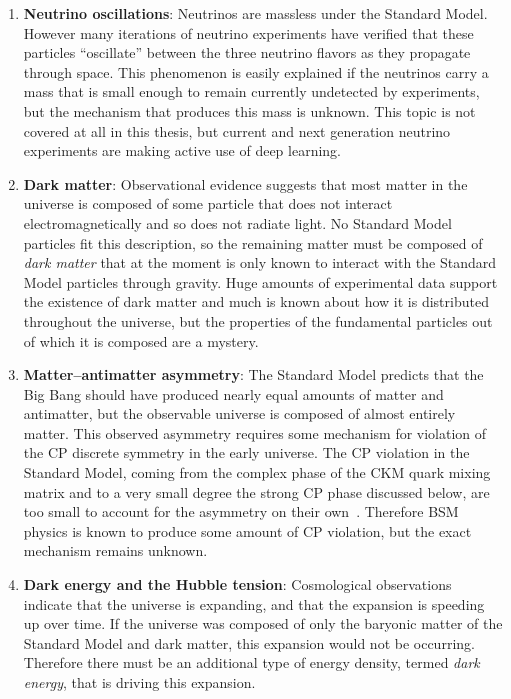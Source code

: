 \begin{enumerate}
    \item{
        \textbf{Neutrino oscillations}: Neutrinos are massless under the Standard Model. However many iterations of neutrino experiments have verified that these particles ``oscillate'' between the three neutrino flavors as they propagate through space. This phenomenon is easily explained if the neutrinos carry a mass that is small enough to remain currently undetected by experiments, but the mechanism that produces this mass is unknown. This topic is not covered at all in this thesis, but current and next generation neutrino experiments are making active use of deep learning.
    }
    \item{
        \textbf{Dark matter}: Observational evidence suggests that most matter in the universe is composed of some particle that does not interact electromagnetically and so does not radiate light.
        No Standard Model particles fit this description, so the remaining matter must be composed of \textit{dark matter} that at the moment is only known to interact with the Standard Model particles through gravity.
        Huge amounts of experimental data support the existence of dark matter and much is known about how it is distributed throughout the universe, but the properties of the fundamental particles out of which it is composed are a mystery.
    }
    \item{
        \textbf{Matter--antimatter asymmetry}: The Standard Model predicts that the Big Bang should have produced nearly equal amounts of matter and antimatter, but the observable universe is composed of almost entirely matter.
        This observed asymmetry requires some mechanism for violation of the CP discrete symmetry in the early universe.
        The CP violation in the Standard Model, coming from the complex phase of the CKM quark mixing matrix and to a very small degree the strong CP phase discussed below, are too small to account for the asymmetry on their own~\cite{Sakharov:1967dj}.
        Therefore BSM physics is known to produce some amount of CP violation, but the exact mechanism remains unknown.
    }
    \item{
        \textbf{Dark energy and the Hubble tension}: Cosmological observations indicate that the universe is expanding, and that the expansion is speeding up over time.
        If the universe was composed of only the baryonic matter of the Standard Model and dark matter, this expansion would not be occurring.
        Therefore there must be an additional type of energy density, termed \textit{dark energy}, that is driving this expansion.
}
\end{enumerate}
